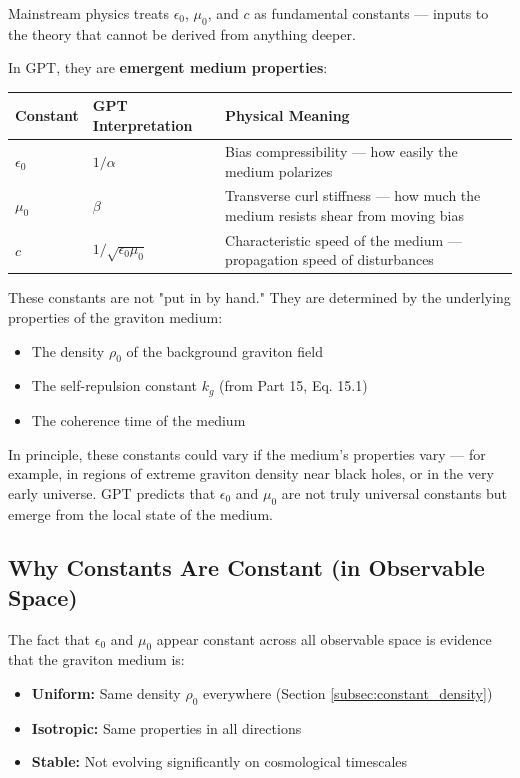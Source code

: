 \documentclass[12pt, a4paper]{article}
\begin{document}
Mainstream physics treats \( \epsilon_0 \), \( \mu_0 \), and \( c \) as fundamental constants — inputs to the theory that cannot be derived from anything deeper.

In GPT, they are \textbf{emergent medium properties}:

\begin{center}
\begin{tabular}{|p{2.5cm}|p{4cm}|p{8cm}|}
\hline
\textbf{Constant} & \textbf{GPT Interpretation} & \textbf{Physical Meaning} \\
\hline
\( \epsilon_0 \) & \( 1/\alpha \) & Bias compressibility — how easily the medium polarizes \\
\hline
\( \mu_0 \) & \( \beta \) & Transverse curl stiffness — how much the medium resists shear from moving bias \\
\hline
\( c \) & \( 1/\sqrt{\epsilon_0 \mu_0} \) & Characteristic speed of the medium — propagation speed of disturbances \\
\hline
\end{tabular}
\end{center}

These constants are not "put in by hand." They are determined by the underlying properties of the graviton medium:
\begin{itemize}
    \item The density \( \rho_0 \) of the background graviton field
    \item The self-repulsion constant \( k_g \) (from Part 15, Eq. 15.1)
    \item The coherence time of the medium
\end{itemize}

In principle, these constants could vary if the medium's properties vary — for example, in regions of extreme graviton density near black holes, or in the very early universe. GPT predicts that \( \epsilon_0 \) and \( \mu_0 \) are not truly universal constants but emerge from the local state of the medium.

\subsection{Why Constants Are Constant (in Observable Space)}
\label{subsec:constants_constant}

The fact that \( \epsilon_0 \) and \( \mu_0 \) appear constant across all observable space is evidence that the graviton medium is:

\begin{itemize}
    \item \textbf{Uniform:} Same density \( \rho_0 \) everywhere (Section \ref{subsec:constant_density})
    \item \textbf{Isotropic:} Same properties in all directions
    \item \textbf{Stable:} Not evolving significantly on cosmological timescales
\end{itemize}
\end{document}
